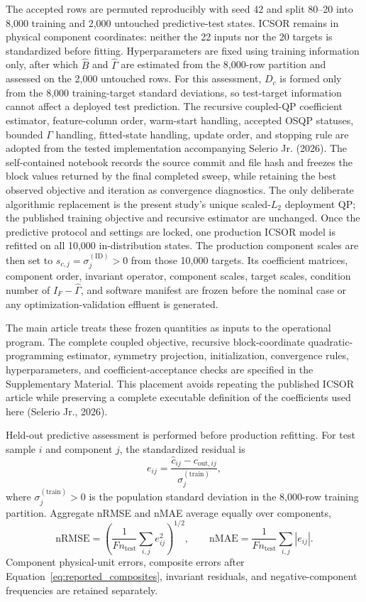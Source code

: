 \documentclass[a4paper,fleqn]{cas-sc}
\begin{document}
The accepted rows are permuted reproducibly with seed 42 and split 80--20 into 8,000 training and 2,000 untouched predictive-test states. ICSOR remains in physical component coordinates: neither the 22 inputs nor the 20 targets is standardized before fitting. Hyperparameters are fixed using training information only, after which $\widehat B$ and $\widehat\Gamma$ are estimated from the 8,000-row partition and assessed on the 2,000 untouched rows. For this assessment, $D_c$ is formed only from the 8,000 training-target standard deviations, so test-target information cannot affect a deployed test prediction. The recursive coupled-QP coefficient estimator, feature-column order, warm-start handling, accepted OSQP statuses, bounded $\Gamma$ handling, fitted-state handling, update order, and stopping rule are adopted from the tested implementation accompanying Selerio Jr. (2026). The self-contained notebook records the source commit and file hash and freezes the block values returned by the final completed sweep, while retaining the best observed objective and iteration as convergence diagnostics. The only deliberate algorithmic replacement is the present study's unique scaled-$L_2$ deployment QP; the published training objective and recursive estimator are unchanged. Once the predictive protocol and settings are locked, one production ICSOR model is refitted on all 10,000 in-distribution states. The production component scales are then set to $s_{c,j}=\sigma_j^{(\mathrm{ID})}>0$ from those 10,000 targets. Its coefficient matrices, component order, invariant operator, component scales, target scales, condition number of $I_F-\widehat\Gamma$, and software manifest are frozen before the nominal case or any optimization-validation effluent is generated.

The main article treats these frozen quantities as inputs to the operational program. The complete coupled objective, recursive block-coordinate quadratic-programming estimator, symmetry projection, initialization, convergence rules, hyperparameters, and coefficient-acceptance checks are specified in the Supplementary Material. This placement avoids repeating the published ICSOR article while preserving a complete executable definition of the coefficients used here (Selerio Jr., 2026).

Held-out predictive assessment is performed before production refitting. For test sample $i$ and component $j$, the standardized residual is
\begin{equation}
\label{eq:test_standardized_residual}
e_{ij}=\frac{\widehat c_{ij}-c_{\mathrm{out},ij}}{\sigma_j^{(\mathrm{train})}},
\end{equation}
where $\sigma_j^{(\mathrm{train})}>0$ is the population standard deviation in the 8,000-row training partition. Aggregate nRMSE and nMAE average equally over components,
\begin{equation}
\label{eq:test_metrics}
\mathrm{nRMSE}=\left(\frac{1}{Fn_{\mathrm{test}}}\sum_{i,j}e_{ij}^2\right)^{1/2},
\qquad
\mathrm{nMAE}=\frac{1}{Fn_{\mathrm{test}}}\sum_{i,j}|e_{ij}|.
\end{equation}
Component physical-unit errors, composite errors after Equation~\eqref{eq:reported_composites}, invariant residuals, and negative-component frequencies are retained separately.
\end{document}
